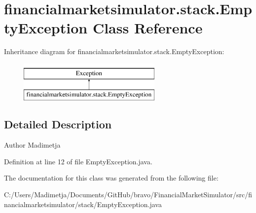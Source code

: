 \hypertarget{classfinancialmarketsimulator_1_1stack_1_1_empty_exception}{\section{financialmarketsimulator.\+stack.\+Empty\+Exception Class Reference}
\label{classfinancialmarketsimulator_1_1stack_1_1_empty_exception}
}
Inheritance diagram for financialmarketsimulator.\+stack.\+Empty\+Exception\+:\begin{figure}[H]
\begin{center}
\leavevmode
\includegraphics[height=2.000000cm]{classfinancialmarketsimulator_1_1stack_1_1_empty_exception}
\end{center}
\end{figure}


\subsection{Detailed Description}
\begin{DoxyAuthor}{Author}
Madimetja 
\end{DoxyAuthor}


Definition at line 12 of file Empty\+Exception.\+java.



The documentation for this class was generated from the following file\+:\begin{DoxyCompactItemize}
\item 
C\+:/\+Users/\+Madimetja/\+Documents/\+Git\+Hub/bravo/\+Financial\+Market\+Simulator/src/financialmarketsimulator/stack/Empty\+Exception.\+java\end{DoxyCompactItemize}
